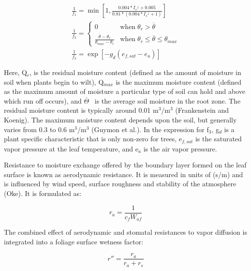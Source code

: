 \begin{equation}
\begin{array}{l}
   \frac{1}{f_1} = \min \left[ 1,\frac{{0.004*{I_s}^ \downarrow  + 0.005}}{{0.81*(0.004*{I_s}^ \downarrow  + 1)}} \right] \\
   \frac{1}{f_2} = \left\{ 
     \begin{array}{cl}
       0                                                                 & \text{when} \; \theta_r > \overline \theta \\
       \frac{ \overline \theta   - \theta_r }{ \theta_{max} - \theta_r } & \text{when} \; \theta_r \leq \overline \theta \leq \theta_{max}
     \end{array} \right. \\
   \frac{1}{f_3} = \exp \left[ - {g_d}({e_{f,sat}} - {e_a}) \right]
\end{array}
\end{equation}

Here, Q\(_{r}\), is the residual moisture content (defined as the amount of moisture in soil when plants begin to wilt), Q\(_{max}\) is the maximum moisture content (defined as the maximum amount of moisture a particular type of soil can hold and above which run off occurs), and \(\overline \Theta\) ~is the average soil moisture in the root zone. The residual moisture content is typically around 0.01 m\(^{3}\)/m\(^{3}\) (Frankenstein and Koenig). The maximum moisture content depends upon the soil, but generally varies from 0.3 to 0.6 m\(^{3}\)/m\(^{3}\) (Guymon et al.). In the expression for f\(_{3}\), g\(_{d}\) is a plant specific characteristic that is only non-zero for trees, e\(_{f,sat}\) is the saturated vapor pressure at the leaf temperature, and e\(_{a}\) is the air vapor pressure.

Resistance to moisture exchange offered by the boundary layer formed on the leaf surface is known as aerodynamic resistance. It is measured in units of (s/m) and is influenced by wind speed, surface roughness and stability of the atmosphere (Oke). It is formulated as:

\begin{equation}
{r_a} = \frac{1}{{{c_f}{W_{af}}}}
\end{equation}

The combined effect of aerodynamic and stomatal resistances to vapor diffusion is integrated into a foliage surface wetness factor:

\begin{equation}
r'' = \frac{{{r_a}}}{{{r_a} + {r_s}}}
\end{equation}

